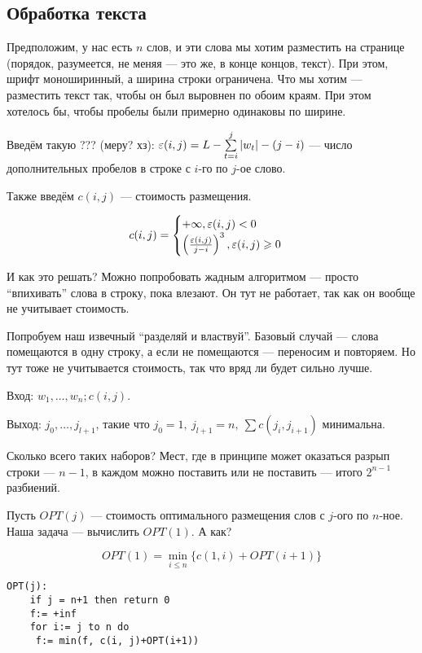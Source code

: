 \subsection{Обработка текста}
Предположим, у нас есть $n$ слов, и эти слова мы хотим разместить на странице (порядок, разумеется, не меняя --- это же, в конце концов, текст). При этом, шрифт моноширинный, а ширина строки ограничена. Что мы хотим --- разместить текст так, чтобы он был выровнен по обоим краям. При этом хотелось бы, чтобы пробелы были примерно одинаковы по ширине.

Введём такую ??? (меру? хз): $\varepsilon(i, j) = L-\sum\limits_{t=i}^j|w_t|-(j-i)$ --- число дополнительных пробелов в строке с $i$-го по $j$-ое слово.

Также введём $c(i, j)$ --- стоимость размещения.

\[
    c(i, j) = \begin{cases}
        +\infty, \varepsilon(i, j) < 0\\
        \left( \frac{\varepsilon(i, j)}{j-i} \right)^3, \varepsilon(i, j) \geqslant 0\\
    \end{cases}
\]

И как это решать? Можно попробовать жадным алгоритмом --- просто ``впихивать'' слова в строку, пока влезают. Он тут не работает, так как он вообще не учитывает стоимость.

Попробуем наш извечный ``разделяй и властвуй''. Базовый случай --- слова помещаются в одну строку, а если не помещаются --- переносим и повторяем. Но тут тоже не учитывается стоимость, так что вряд ли будет сильно лучше.

Вход: $w_1, \ldots, w_n; c(i, j)$.

Выход: $j_0, \ldots, j_{l+1}$, такие что $j_0 = 1,\ j_{l+1} = n,\ \sum c(j_i, j_{i+1})$ минимальна.

Сколько всего таких наборов? Мест, где в принципе может оказаться разрып строки --- $n-1$, в каждом можно поставить или не поставить --- итого $2^{n-1}$ разбиений.

Пусть $OPT(j)$ --- стоимость оптимального размещения слов с $j$-ого по $n$-ное. Наша задача --- вычислить $OPT(1)$. А как?

\[
    OPT(1) = \min\limits_{i\leqslant n}\{c(1, i)+OPT(i+1)\}
\]

\begin{lstlisting}
OPT(j):
    if j = n+1 then return 0
    f:= +inf
    for i:= j to n do
     f:= min(f, c(i, j)+OPT(i+1))
\end{lstlisting}

